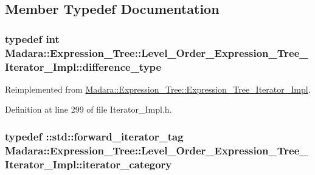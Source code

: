 \subsection{Member Typedef Documentation}
\hypertarget{classMadara_1_1Expression__Tree_1_1Level__Order__Expression__Tree__Iterator__Impl_a7400a3a22e09dbb8ba5064bb902e5879}{
\subsubsection[{difference\_\-type}]{\setlength{\rightskip}{0pt plus 5cm}typedef int {\bf Madara::Expression\_\-Tree::Level\_\-Order\_\-Expression\_\-Tree\_\-Iterator\_\-Impl::difference\_\-type}}}
\label{dc/de7/classMadara_1_1Expression__Tree_1_1Level__Order__Expression__Tree__Iterator__Impl_a7400a3a22e09dbb8ba5064bb902e5879}


Reimplemented from \hyperlink{classMadara_1_1Expression__Tree_1_1Expression__Tree__Iterator__Impl_ae0238cb942a1398b7cd91dffe4c5ba3c}{Madara::Expression\_\-Tree::Expression\_\-Tree\_\-Iterator\_\-Impl}.



Definition at line 299 of file Iterator\_\-Impl.h.

\hypertarget{classMadara_1_1Expression__Tree_1_1Level__Order__Expression__Tree__Iterator__Impl_a0ba7cef7284272a0231bb5b8a6f1dcef}{
\subsubsection[{iterator\_\-category}]{\setlength{\rightskip}{0pt plus 5cm}typedef ::std::forward\_\-iterator\_\-tag {\bf Madara::Expression\_\-Tree::Level\_\-Order\_\-Expression\_\-Tree\_\-Iterator\_\-Impl::iterator\_\-category}}}
\label{dc/de7/classMadara_1_1Expression__Tree_1_1Level__Order__Expression__Tree__Iterator__Impl_a0ba7cef7284272a0231bb5b8a6f1dcef}



